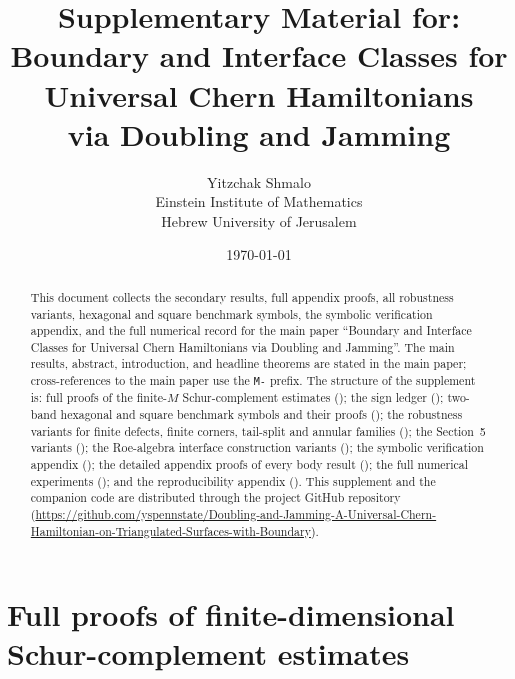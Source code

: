 \documentclass[11pt]{article}
\title{Supplementary Material for: Boundary and Interface Classes for Universal Chern Hamiltonians\\
via Doubling and Jamming}
\author{
Yitzchak Shmalo\\[0.6em]
Einstein Institute of Mathematics\\
Hebrew University of Jerusalem
}
\date{\today}
\numberwithin{equation}{section}
\theoremstyle{definition}
\theoremstyle{remark}
\begin{document}
\maketitle

\begin{abstract}
This document collects the secondary results, full appendix proofs, all robustness variants,
hexagonal and square benchmark symbols, the symbolic verification appendix, and the full numerical
record for the main paper ``Boundary and Interface Classes for Universal Chern Hamiltonians via
Doubling and Jamming''. The main results, abstract, introduction, and headline theorems are stated
in the main paper; cross-references to the main paper use the \texttt{M-} prefix. The structure of
the supplement is: full proofs of the finite-\(M\) Schur-complement estimates
(); the sign ledger (); two-band hexagonal and square
benchmark symbols and their proofs (); the robustness variants for
finite defects, finite corners, tail-split and annular families
();
the Section~5 variants (); the Roe-algebra interface construction
variants (); the symbolic verification appendix
(); the detailed appendix proofs of every body result
(); the full numerical experiments
(); and the reproducibility appendix
(). This supplement and the
companion code are distributed through the project GitHub repository
(\url{https://github.com/yspennstate/Doubling-and-Jamming-A-Universal-Chern-Hamiltonian-on-Triangulated-Surfaces-with-Boundary}).
\end{abstract}


\section{Full proofs of finite-dimensional Schur-complement estimates}\label{sec:schur_proofs}
\end{document}
